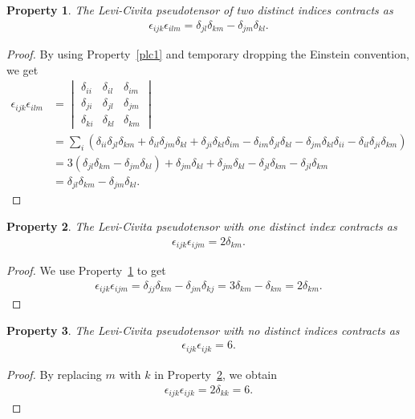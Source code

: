 \documentclass[12pt,a4paper]{report}
\newtheorem{property}{Property}[section]
\theoremstyle{definition}
\theoremstyle{remark}
\theoremstyle{remark}
\begin{document}
\begin{appendices}
\begin{property}\label{plc2}
The Levi-Civita pseudotensor of two distinct indices contracts as
\begin{align*}
\epsilon_{ijk}\epsilon_{ilm}=\delta_{jl}\delta_{km}-\delta_{jm}\delta_{kl}.
\end{align*}
\end{property}
\begin{proof}
By using Property~\ref{plc1} and temporary dropping the Einstein convention, we get
\begin{align*}
\epsilon_{ijk}\epsilon_{ilm} &=\begin{vmatrix} 
\delta_{ii} & \delta_{il} & \delta_{im}\\
\delta_{ji} & \delta_{jl} & \delta_{jm}\\
\delta_{ki} & \delta_{kl} & \delta_{km}
\end{vmatrix} \\
&=\sum_{i}\left(\delta_{ii}\delta_{jl}\delta_{km}+\delta_{il}\delta_{jm}\delta_{kl}+\delta_{ji}\delta_{kl}\delta_{im}-\delta_{im}\delta_{jl}\delta_{kl}-\delta_{jm}\delta_{kl}\delta_{ii}-\delta_{il}\delta_{ji}\delta_{km}\right) \\
&= 3(\delta_{jl}\delta_{km}-\delta_{jm}\delta_{kl})+\delta_{jm}\delta_{kl}+\delta_{jm}\delta_{kl}-\delta_{jl}\delta_{km}-\delta_{jl}\delta_{km} \\
&= \delta_{jl}\delta_{km}-\delta_{jm}\delta_{kl}.
\end{align*}
\end{proof}

\begin{property}\label{plc3}
The Levi-Civita pseudotensor with one distinct index contracts as
\begin{align*}
\epsilon_{ijk}\epsilon_{ijm}=2\delta_{km}.
\end{align*}
\end{property}
\begin{proof}
We use Property~\ref{plc2} to get
\begin{align*}
\epsilon_{ijk}\epsilon_{ijm}=\delta_{jj}\delta_{km}-\delta_{jm}\delta_{kj}=3\delta_{km}-\delta_{km}=2\delta_{km}.
\end{align*}
\end{proof}

\begin{property}\label{plc4}
The Levi-Civita pseudotensor with no distinct indices contracts as
\begin{align*}
\epsilon_{ijk}\epsilon_{ijk}=6.
\end{align*}
\end{property}
\begin{proof}
By replacing $m$ with $k$ in Property~\ref{plc3}, we obtain
\begin{align*}
\epsilon_{ijk}\epsilon_{ijk}=2\delta_{kk}=6.
\end{align*}
\end{proof}


\end{appendices}
\end{document}
